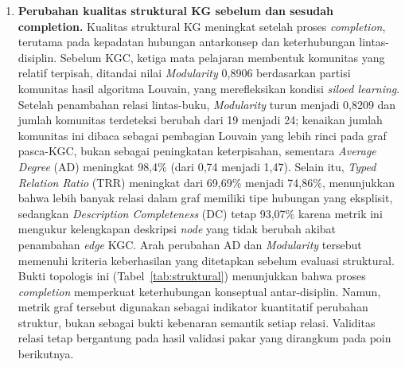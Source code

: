 \documentclass[../../thesis]{subfiles}
\begin{document}
\begin{enumerate}
  \item \textbf{Perubahan kualitas struktural KG sebelum dan sesudah completion.}
        Kualitas struktural KG meningkat setelah proses \textit{completion},
        terutama pada kepadatan hubungan antarkonsep dan keterhubungan
        lintas-disiplin. Sebelum KGC, ketiga mata pelajaran membentuk komunitas
        yang relatif terpisah, ditandai nilai \textit{Modularity} 0{,}8906
        berdasarkan partisi komunitas hasil algoritma Louvain, yang merefleksikan
        kondisi \textit{siloed learning}. Setelah penambahan
        relasi lintas-buku, \textit{Modularity} turun menjadi 0{,}8209 dan jumlah
        komunitas terdeteksi berubah dari 19 menjadi 24; kenaikan jumlah
        komunitas ini dibaca sebagai pembagian Louvain yang lebih rinci pada graf
        pasca-KGC, bukan sebagai peningkatan keterpisahan, sementara
        \textit{Average Degree} (AD) meningkat 98{,}4\% (dari 0{,}74 menjadi
        1{,}47). Selain itu, \textit{Typed Relation Ratio} (TRR) meningkat dari
        69{,}69\% menjadi 74{,}86\%, menunjukkan bahwa lebih banyak relasi dalam
        graf memiliki tipe hubungan yang eksplisit, sedangkan
        \textit{Description Completeness} (DC) tetap 93{,}07\% karena metrik ini
        mengukur kelengkapan deskripsi \textit{node} yang tidak berubah akibat
        penambahan \textit{edge} KGC. Arah perubahan AD dan
        \textit{Modularity} tersebut memenuhi kriteria keberhasilan yang
        ditetapkan sebelum evaluasi struktural. Bukti topologis ini
        (Tabel~\ref{tab:struktural}) menunjukkan bahwa proses
        \textit{completion} memperkuat keterhubungan konseptual antar-disiplin.
        Namun, metrik graf tersebut digunakan sebagai indikator kuantitatif
        perubahan struktur, bukan sebagai bukti kebenaran semantik setiap relasi.
        Validitas relasi tetap bergantung pada hasil validasi pakar yang
        dirangkum pada poin berikutnya.


\end{enumerate}
\end{document}
